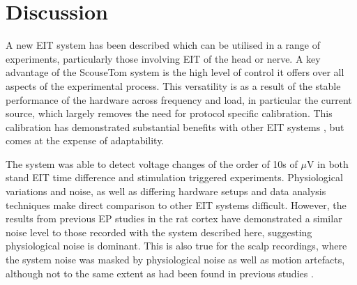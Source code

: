 \section{Discussion}
A new EIT system has been described which can be utilised in a range of experiments, particularly those involving EIT of the head or nerve. A key advantage of the ScouseTom system is the high level of control it offers over all aspects of the experimental process. This versatility is as a result of the stable performance of the hardware across frequency and load, in particular the current source, which largely removes the need for protocol specific calibration. This calibration has demonstrated substantial benefits with other EIT systems \cite{Hun_Wi_2014} \cite{khan}, but comes at the expense of adaptability.









The system was able to detect voltage changes of the order of 10s of $\mu$V in both stand EIT time difference and stimulation triggered experiments. Physiological variations and noise, as well as differing hardware setups and data analysis techniques make direct comparison to other EIT systems difficult. However, the results from previous EP studies \cite{Oh2011} in the rat cortex have demonstrated a similar noise level to those recorded with the system described here, suggesting physiological noise is dominant. This is also true for the scalp recordings, where the system noise was masked by physiological noise as well as motion artefacts, although not to the same extent as had been found in previous studies \cite{Fabrizi_2006}. 
